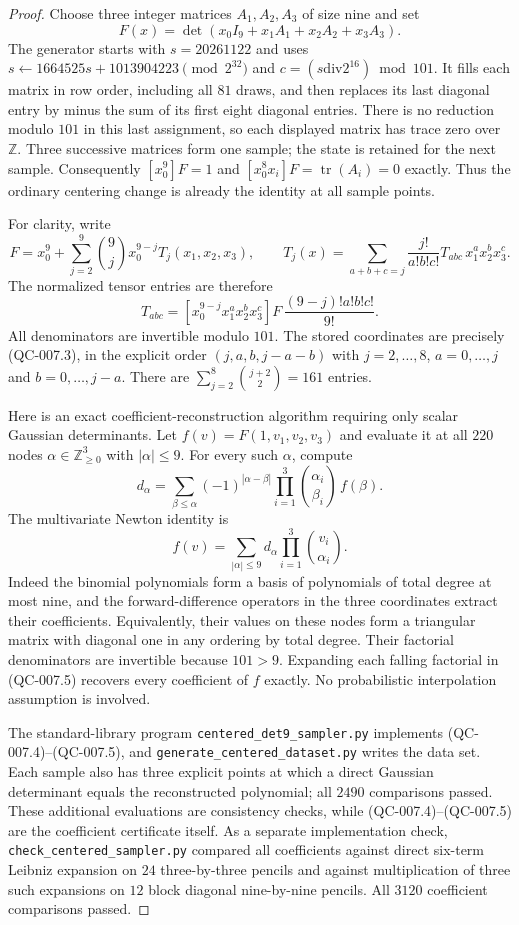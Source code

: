 \begin{proof}
Choose three integer matrices $A_1,A_2,A_3$ of size nine and set
\[
 F(x)=\det(x_0I_9+x_1A_1+x_2A_2+x_3A_3).
 \tag{QC-007.1}
\]
The generator starts with $s=20261122$ and uses
$s\leftarrow1664525s+1013904223\pmod {2^{32}}$ and
$c=(s\mathbin{\mathrm{div}}2^{16})\bmod101$. It fills each
matrix in row order, including all $81$ draws, and then
replaces its last diagonal entry by minus the sum of its
first eight diagonal entries. There is no reduction modulo
$101$ in this last assignment, so each displayed matrix has
trace zero over $\mathbb Z$. Three successive matrices form
one sample; the state is retained for the next sample.
Consequently $[x_0^9]F=1$ and
$[x_0^8x_i]F=\operatorname{tr}(A_i)=0$ exactly. Thus the
ordinary centering change is already the identity at all
sample points.

For clarity, write
\[
 F=x_0^9+\sum_{j=2}^9\binom9j x_0^{9-j}
 T_j(x_1,x_2,x_3),
 \qquad
 T_j(x)=\sum_{a+b+c=j}\frac{j!}{a!b!c!}
 T_{abc}\,x_1^ax_2^bx_3^c.
 \tag{QC-007.2}
\]
The normalized tensor entries are therefore
\[
 T_{abc}=
 [x_0^{9-j}x_1^ax_2^bx_3^c]F\,
 \frac{(9-j)!a!b!c!}{9!}.
 \tag{QC-007.3}
\]
All denominators are invertible modulo $101$. The stored
coordinates are precisely (QC-007.3), in the explicit order
$(j,a,b,j-a-b)$ with $j=2,\ldots,8$, $a=0,\ldots,j$ and
$b=0,\ldots,j-a$. There are
$\sum_{j=2}^{8}\binom{j+2}{2}=161$ entries.

Here is an exact coefficient-reconstruction algorithm requiring
only scalar Gaussian determinants. Let
$f(v)=F(1,v_1,v_2,v_3)$ and evaluate it at all $220$ nodes
$\alpha\in\mathbb Z_{\geq0}^3$ with $|\alpha|\leq9$.
For every such $\alpha$, compute
\[
 d_\alpha=
 \sum_{\beta\leq\alpha}(-1)^{|\alpha-\beta|}
 \prod_{i=1}^3\binom{\alpha_i}{\beta_i}\,f(\beta).
 \tag{QC-007.4}
\]
The multivariate Newton identity is
\[
 f(v)=\sum_{|\alpha|\leq9}
 d_\alpha\prod_{i=1}^3\binom{v_i}{\alpha_i}.
 \tag{QC-007.5}
\]
Indeed the binomial polynomials form a basis of polynomials
of total degree at most nine, and the forward-difference
operators in the three coordinates extract their coefficients.
Equivalently, their values on these nodes form a triangular
matrix with diagonal one in any ordering by total degree.
Their factorial denominators are invertible because $101>9$.
Expanding each falling factorial in (QC-007.5) recovers every
coefficient of $f$ exactly. No probabilistic interpolation
assumption is involved.

The standard-library program \texttt{centered\_det9\_sampler.py}
implements (QC-007.4)--(QC-007.5), and
\texttt{generate\_centered\_dataset.py} writes the data set.
Each sample also has three explicit points at which a direct
Gaussian determinant equals the reconstructed polynomial;
all $2490$ comparisons passed. These additional evaluations
are consistency checks, while (QC-007.4)--(QC-007.5) are the
coefficient certificate itself. As a separate implementation
check, \texttt{check\_centered\_sampler.py} compared all
coefficients against direct six-term Leibniz expansion on
$24$ three-by-three pencils and against multiplication of
three such expansions on $12$ block diagonal nine-by-nine
pencils. All $3120$ coefficient comparisons passed.


\end{proof}
